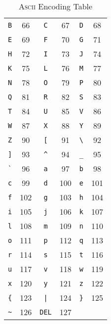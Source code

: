\begin{table}[!th]
\begin{tabular}{|c|c|c|c|c|c|}
        \texttt{B} & 66 & \texttt{C} & 67 & \texttt{D} & 68 \\
        \texttt{E} & 69 & \texttt{F} & 70 & \texttt{G} & 71 \\
        \texttt{H} & 72 & \texttt{I} & 73 & \texttt{J} & 74 \\
        \texttt{K} & 75 & \texttt{L} & 76 & \texttt{M} & 77 \\
        \texttt{N} & 78 & \texttt{O} & 79 & \texttt{P} & 80 \\
        \texttt{Q} & 81 & \texttt{R} & 82 & \texttt{S} & 83 \\
        \texttt{T} & 84 & \texttt{U} & 85 & \texttt{V} & 86 \\
        \texttt{W} & 87 & \texttt{X} & 88 & \texttt{Y} & 89 \\
        \texttt{Z} & 90 & \texttt{[} & 91 & \texttt{\textbackslash} & 92 \\
        \texttt{]} & 93 & \texttt{\^} & 94 & \texttt{\_} & 95 \\
        \texttt{\`} & 96 & \texttt{a} & 97 & \texttt{b} & 98 \\
        \texttt{c} & 99 & \texttt{d} & 100 & \texttt{e} & 101 \\
        \texttt{f} & 102 & \texttt{g} & 103 & \texttt{h} & 104 \\
        \texttt{i} & 105 & \texttt{j} & 106 & \texttt{k} & 107 \\
        \texttt{l} & 108 & \texttt{m} & 109 & \texttt{n} & 110 \\
        \texttt{o} & 111 & \texttt{p} & 112 & \texttt{q} & 113 \\
        \texttt{r} & 114 & \texttt{s} & 115 & \texttt{t} & 116 \\
        \texttt{u} & 117 & \texttt{v} & 118 & \texttt{w} & 119 \\
        \texttt{x} & 120 & \texttt{y} & 121 & \texttt{z} & 122 \\
        \texttt{\{} & 123 & \texttt{|} & 124 & \texttt{\}} & 125 \\
        \texttt{\textasciitilde} & 126 & \texttt{DEL} & 127 &  & \\
        \hline
    \end{tabular}
    \caption{\textsc{Ascii} Encoding Table}
    \label{tab:ascii_table}
\end{table}

